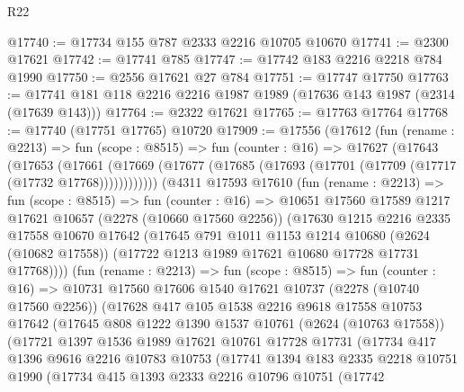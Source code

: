 \begin{lexlean}{R22}
\begin{coremodule}
@17740 := @17734 @155 @787 @2333 @2216 @10705 @10670
@17741 := @2300 @17621
@17742 := @17741 @785
@17747 := @17742 @183 @2216 @2218 @784 @1990
@17750 := @2556 @17621 @27 @784
@17751 := @17747 @17750
@17763 := @17741 @181 @118 @2216 @2216 @1987 @1989 (@17636 @143 @1987 (@2314 (@17639 @143)))
@17764 := @2322 @17621
@17765 := @17763 @17764
@17768 := @17740 (@17751 @17765) @10720
@17909 := @17556
    (@17612
      (fun (rename : @2213) =>
      fun (scope : @8515) =>
      fun (counter : @16) =>
      @17627
        (@17643
          (@17653
            (@17661
              (@17669 (@17677 (@17685 (@17693 (@17701 (@17709 (@17717 (@17732 @17768))))))))))))
      (@4311
        @17593
        @17610
        (fun (rename : @2213) =>
        fun (scope : @8515) =>
        fun (counter : @16) =>
        @10651
          @17560
          @17589
          @1217
          @17621
          @10657
          (@2278 (@10660 @17560 @2256))
          (@17630
            @1215
            @2216
            @2335
            @17558
            @10670
            @17642
            (@17645
              @791
              @1011
              @1153
              @1214
              @10680
              (@2624 (@10682 @17558))
              (@17722 @1213 @1989 @17621 @10680 @17728 @17731 @17768))))
        (fun (rename : @2213) =>
        fun (scope : @8515) =>
        fun (counter : @16) =>
        @10731
          @17560
          @17606
          @1540
          @17621
          @10737
          (@2278 (@10740 @17560 @2256))
          (@17628
            @417
            @105
            @1538
            @2216
            @9618
            @17558
            @10753
            @17642
            (@17645
              @808
              @1222
              @1390
              @1537
              @10761
              (@2624 (@10763 @17558))
              (@17721
                @1397
                @1536
                @1989
                @17621
                @10761
                @17728
                @17731
                (@17734
                  @417
                  @1396
                  @9616
                  @2216
                  @10783
                  @10753
                  (@17741
                    @1394
                    @183
                    @2335
                    @2218
                    @10751
                    @1990
                    (@17734
                      @415
                      @1393
                      @2333
                      @2216
                      @10796
                      @10751
                      (@17742

\end{coremodule}
\end{lexlean}

